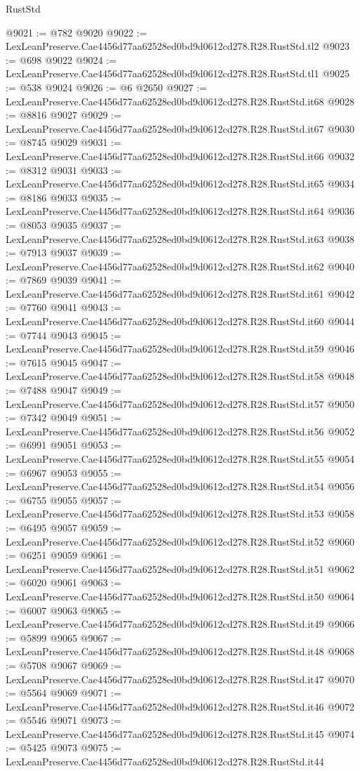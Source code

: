 \begin{lexlean}{RustStd}
\begin{coremodule}
@9021 := @782 @9020
@9022 := LexLeanPreserve.Cae4456d77aa62528ed0bd9d0612cd278.R28.RustStd.tl2
@9023 := @698 @9022
@9024 := LexLeanPreserve.Cae4456d77aa62528ed0bd9d0612cd278.R28.RustStd.tl1
@9025 := @538 @9024
@9026 := @6 @2650
@9027 := LexLeanPreserve.Cae4456d77aa62528ed0bd9d0612cd278.R28.RustStd.it68
@9028 := @8816 @9027
@9029 := LexLeanPreserve.Cae4456d77aa62528ed0bd9d0612cd278.R28.RustStd.it67
@9030 := @8745 @9029
@9031 := LexLeanPreserve.Cae4456d77aa62528ed0bd9d0612cd278.R28.RustStd.it66
@9032 := @8312 @9031
@9033 := LexLeanPreserve.Cae4456d77aa62528ed0bd9d0612cd278.R28.RustStd.it65
@9034 := @8186 @9033
@9035 := LexLeanPreserve.Cae4456d77aa62528ed0bd9d0612cd278.R28.RustStd.it64
@9036 := @8053 @9035
@9037 := LexLeanPreserve.Cae4456d77aa62528ed0bd9d0612cd278.R28.RustStd.it63
@9038 := @7913 @9037
@9039 := LexLeanPreserve.Cae4456d77aa62528ed0bd9d0612cd278.R28.RustStd.it62
@9040 := @7869 @9039
@9041 := LexLeanPreserve.Cae4456d77aa62528ed0bd9d0612cd278.R28.RustStd.it61
@9042 := @7760 @9041
@9043 := LexLeanPreserve.Cae4456d77aa62528ed0bd9d0612cd278.R28.RustStd.it60
@9044 := @7744 @9043
@9045 := LexLeanPreserve.Cae4456d77aa62528ed0bd9d0612cd278.R28.RustStd.it59
@9046 := @7615 @9045
@9047 := LexLeanPreserve.Cae4456d77aa62528ed0bd9d0612cd278.R28.RustStd.it58
@9048 := @7488 @9047
@9049 := LexLeanPreserve.Cae4456d77aa62528ed0bd9d0612cd278.R28.RustStd.it57
@9050 := @7342 @9049
@9051 := LexLeanPreserve.Cae4456d77aa62528ed0bd9d0612cd278.R28.RustStd.it56
@9052 := @6991 @9051
@9053 := LexLeanPreserve.Cae4456d77aa62528ed0bd9d0612cd278.R28.RustStd.it55
@9054 := @6967 @9053
@9055 := LexLeanPreserve.Cae4456d77aa62528ed0bd9d0612cd278.R28.RustStd.it54
@9056 := @6755 @9055
@9057 := LexLeanPreserve.Cae4456d77aa62528ed0bd9d0612cd278.R28.RustStd.it53
@9058 := @6495 @9057
@9059 := LexLeanPreserve.Cae4456d77aa62528ed0bd9d0612cd278.R28.RustStd.it52
@9060 := @6251 @9059
@9061 := LexLeanPreserve.Cae4456d77aa62528ed0bd9d0612cd278.R28.RustStd.it51
@9062 := @6020 @9061
@9063 := LexLeanPreserve.Cae4456d77aa62528ed0bd9d0612cd278.R28.RustStd.it50
@9064 := @6007 @9063
@9065 := LexLeanPreserve.Cae4456d77aa62528ed0bd9d0612cd278.R28.RustStd.it49
@9066 := @5899 @9065
@9067 := LexLeanPreserve.Cae4456d77aa62528ed0bd9d0612cd278.R28.RustStd.it48
@9068 := @5708 @9067
@9069 := LexLeanPreserve.Cae4456d77aa62528ed0bd9d0612cd278.R28.RustStd.it47
@9070 := @5564 @9069
@9071 := LexLeanPreserve.Cae4456d77aa62528ed0bd9d0612cd278.R28.RustStd.it46
@9072 := @5546 @9071
@9073 := LexLeanPreserve.Cae4456d77aa62528ed0bd9d0612cd278.R28.RustStd.it45
@9074 := @5425 @9073
@9075 := LexLeanPreserve.Cae4456d77aa62528ed0bd9d0612cd278.R28.RustStd.it44

\end{coremodule}
\end{lexlean}
